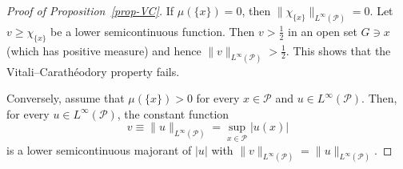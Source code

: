 \documentclass[10pt,a4paper]{amsart}
\renewcommand{\P}{\mathcal{P}}
\begin{document}
\begin{proof}[Proof of Proposition~\ref{prop-VC}]
If $\mu(\{x\})=0$, then $\|\chi_{\{x\}}\|_{L^\infty(\P)} =0$.
Let $v\ge \chi_{\{x\}}$ be a lower semicontinuous function.
Then $v>\tfrac12$  in an open set $G\ni x$ (which has positive measure) and hence 
$\|v\|_{L^\infty(\P)}> \tfrac12$.
This shows that the Vitali--Carath\'eodory property fails.

Conversely, assume that $\mu(\{x\})>0$ for every $x\in\P$ and $u\in L^\infty(\P)$.
Then, for every $u\in  L^\infty(\P)$, the constant function
\[
v \equiv \|u\|_{L^\infty(\P)} = \sup_{x\in \P} |u(x)|
\]
is a lower semicontinuous 
majorant of $|u|$ with $\|v\|_{L^\infty(\P)} = \|u\|_{L^\infty(\P)}$.
\end{proof}
\end{document}
